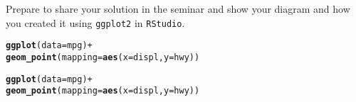 \documentclass[a4paper,12pt]{article}\usepackage[]{graphicx}\usepackage[]{color}
\makeatletter
\newcommand{\hlopt}[1]{\textcolor[rgb]{0,0,0}{#1}}%
\newcommand{\hlstd}[1]{\textcolor[rgb]{0.345,0.345,0.345}{#1}}%
\newcommand{\hlkwc}[1]{\textcolor[rgb]{0.333,0.667,0.333}{#1}}%
\newcommand{\hlkwd}[1]{\textcolor[rgb]{0.737,0.353,0.396}{\textbf{#1}}}%
\newenvironment{kframe}{%
 \def\at@end@of@kframe{}%
 \ifinner\ifhmode%
  \def\at@end@of@kframe{\end{minipage}}%
  \begin{minipage}{\columnwidth}%
 \fi\fi%
 \def\FrameCommand##1{\hskip\@totalleftmargin \hskip-\fboxsep
 \colorbox{shadecolor}{##1}\hskip-\fboxsep
     \hskip-\linewidth \hskip-\@totalleftmargin \hskip\columnwidth}%
 \MakeFramed {\advance\hsize-\width
   \@totalleftmargin\z@ \linewidth\hsize
   \@setminipage}}%
 {\par\unskip\endMakeFramed%
 \at@end@of@kframe}
\newenvironment{knitrout}{}{} %
\makeatother
\begin{document}
Prepare to share your solution in the seminar and show your diagram and how you created it using \verb+ggplot2+ in \texttt{RStudio}.
\begin{knitrout}
\color{fgcolor}\begin{kframe}
\begin{alltt}
\hlkwd{ggplot}\hlstd{(}\hlkwc{data} \hlstd{= mpg)} \hlopt{+}
  \hlkwd{geom_point}\hlstd{(}\hlkwc{mapping} \hlstd{=} \hlkwd{aes}\hlstd{(}\hlkwc{x} \hlstd{= displ,} \hlkwc{y} \hlstd{= hwy))}
\end{alltt}


{\ttfamily\noindent\bfseries{}}\end{kframe}
\end{knitrout}
\begin{knitrout}
\color{fgcolor}\begin{kframe}
\begin{alltt}
\hlkwd{ggplot}\hlstd{(}\hlkwc{data} \hlstd{= mpg)} \hlopt{+}
  \hlkwd{geom_point}\hlstd{(}\hlkwc{mapping} \hlstd{=} \hlkwd{aes}\hlstd{(}\hlkwc{x} \hlstd{= displ,} \hlkwc{y} \hlstd{= hwy))}
\end{alltt}


{\ttfamily\noindent\bfseries{}}\end{kframe}
\end{knitrout}
\end{document}
